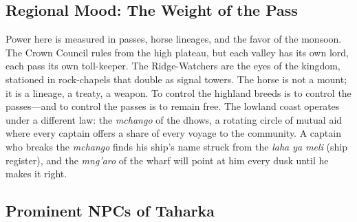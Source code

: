\subsection*{Regional Mood: The Weight of the Pass}
Power here is measured in passes, horse lineages, and the favor of the monsoon. The Crown Council rules from the high plateau, but each valley has its own lord, each pass its own toll-keeper. The Ridge-Watchers are the eyes of the kingdom, stationed in rock-chapels that double as signal towers. The horse is not a mount; it is a lineage, a treaty, a weapon. To control the highland breeds is to control the passes---and to control the passes is to remain free. The lowland coast operates under a different law: the \textit{mchango} of the dhows, a rotating circle of mutual aid where every captain offers a share of every voyage to the community. A captain who breaks the \textit{mchango} finds his ship's name struck from the \textit{laha ya meli} (ship register), and the \textit{mng'aro} of the wharf will point at him every dusk until he makes it right.

\subsection{Prominent NPCs of Taharka}
\label{sec:taharka-npcs}

